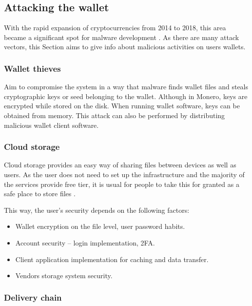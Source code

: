 \documentclass[
  printed, %
  table,   %
  lof,     %
  lot,     %
           oneside, color
]{fithesis3}
\begin{document}
\begin{itemize}
\begin{itemize}
\end{itemize}
\end{itemize} 

\subsection{Attacking the wallet}
With the rapid expansion of cryptocurrencies from 2014 to 2018, this area became a significant spot for malware development \cite{schaupp2018cryptocurrency}. As there are many attack vectors, this Section aims to give info about malicious activities on users wallets.

\subsubsection{Wallet thieves}

Aim to compromise the system in a way that malware finds wallet files and steals cryptographic keys or seed belonging to the wallet. Although in Monero, keys are encrypted while stored on the disk. When running wallet software, keys can be obtained from memory. This attack can also be performed by distributing malicious wallet client software.

\subsubsection{Cloud storage}

Cloud storage provides an easy way of sharing files between devices as well as users. As the user does not need to set up the infrastructure and the majority of the services provide free tier, it is usual for people to take this for granted as a safe place to store files \cite{caviglione2017covert}.

This way, the user's security depends on the following factors:
\begin{itemize}\itemsep0em
\item Wallet encryption on the file level, user password habits.
\item Account security -- login implementation, 2FA.
\item Client application implementation for caching and data transfer.
\item Vendors storage system security.
\end{itemize} 

\subsubsection{Delivery chain}
\end{document}
